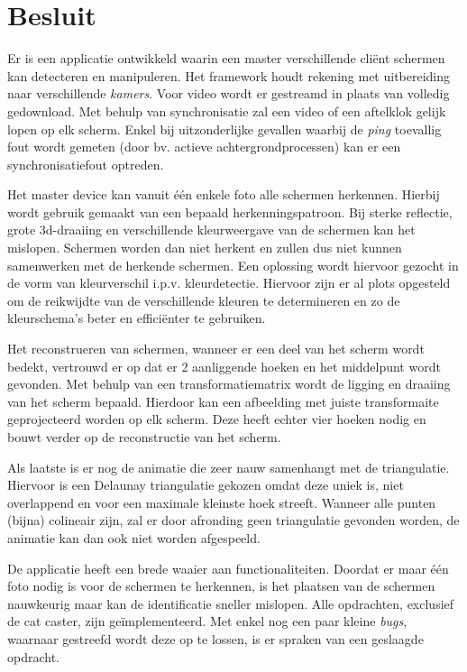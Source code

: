 \section{Besluit}
Er is een applicatie ontwikkeld waarin een master verschillende cliënt schermen kan detecteren en manipuleren. Het framework houdt rekening met uitbereiding naar verschillende {\it kamers}. Voor video wordt er gestreamd in plaats van volledig gedownload. Met behulp van synchronisatie zal een video of een aftelklok gelijk lopen op elk scherm. Enkel bij uitzonderlijke gevallen waarbij de {\it ping} toevallig fout wordt gemeten (door bv. actieve achtergrondprocessen) kan er een synchronisatiefout optreden.

Het master device kan vanuit één enkele foto alle schermen herkennen. Hierbij wordt gebruik gemaakt van een bepaald herkenningspatroon. Bij sterke reflectie, grote 3d-draaiing en verschillende kleurweergave van de schermen kan het mislopen. Schermen worden dan niet herkent en zullen dus niet kunnen samenwerken met de herkende schermen. Een oplossing wordt hiervoor gezocht in de vorm van kleurverschil i.p.v. kleurdetectie. Hiervoor zijn er al plots opgesteld om de reikwijdte van de verschillende kleuren te determineren en zo de kleurschema's beter en efficiënter te gebruiken.

Het reconstrueren van schermen, wanneer er een deel van het scherm wordt bedekt, vertrouwd er op dat er 2 aanliggende hoeken en het middelpunt wordt gevonden. Met behulp van een transformatiematrix wordt de ligging en draaiing van het scherm bepaald. Hierdoor kan een afbeelding met juiste transformaite geprojecteerd worden op elk scherm. Deze heeft echter vier hoeken nodig en bouwt verder op de reconstructie van het scherm.

Als laatste is er nog de animatie die zeer nauw samenhangt met de triangulatie. Hiervoor is een Delaunay triangulatie gekozen omdat deze uniek is, niet overlappend en voor een maximale kleinste hoek streeft. Wanneer alle punten (bijna) colineair zijn, zal er door afronding geen triangulatie gevonden worden, de animatie kan dan ook niet worden afgespeeld.

De applicatie heeft een brede waaier aan functionaliteiten. Doordat er maar één foto nodig is voor de schermen te herkennen, is het plaatsen van de schermen nauwkeurig maar kan de identificatie sneller mislopen. Alle opdrachten, exclusief de cat caster, zijn geïmplementeerd. Met enkel nog een paar kleine {\it bugs}, waarnaar gestreefd wordt deze op te lossen, is er spraken van een geslaagde opdracht.